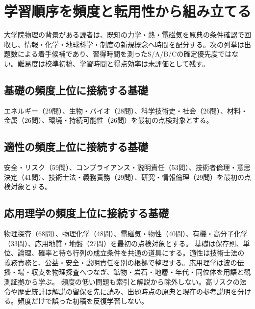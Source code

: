 \chapter{学習順序を頻度と転用性から組み立てる}
大学院物理の背景がある読者は、既知の力学・熱・電磁気を原典の条件確認で回収し、情報・化学・地球科学・制度の新規概念へ時間を配分する。次の列挙は出題数による着手候補であり、習得時間を測ったS/A/B/Cの確定優先度ではない。難易度は校準初稿、学習時間と得点効率は未評価として残す。
\section{基礎の頻度上位に接続する基礎}
エネルギー（29問）、生物・バイオ（28問）、科学技術史・社会（26問）、材料・金属（26問）、環境・持続可能性（26問）を最初の点検対象とする。
\section{適性の頻度上位に接続する基礎}
安全・リスク（59問）、コンプライアンス・説明責任（53問）、技術者倫理・意思決定（41問）、技術士法・義務責務（29問）、研究・情報倫理（29問）を最初の点検対象とする。
\section{応用理学の頻度上位に接続する基礎}
物理探査（68問）、物理化学（48問）、電磁気・物性（40問）、有機・高分子化学（33問）、応用地質・地盤（27問）を最初の点検対象とする。
基礎は保存則、単位、論理、確率と待ち行列の成立条件を共通の道具にする。適性は技術士法の義務責務と、公益・安全・説明責任を別の根拠で整理する。応用理学は波の伝播・場・収支を物理探査へつなぎ、鉱物・岩石・地層・年代・同位体を用語と観測証拠から学ぶ。
頻度の低い問題も索引と解説から除外しない。高リスクの法令や歴史統計は解説の留保を先に読み、出題時点の原典と現在の参考説明を分ける。頻度だけで誤った初稿を反復学習しない。
